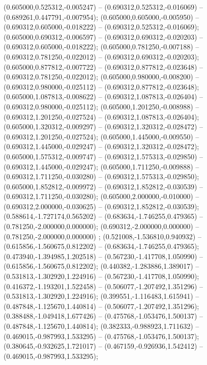  (0.605000,0.525312,-0.005247) -- (0.690312,0.525312,-0.016069) -- (0.689261,0.447791,-0.007954);
 (0.605000,0.605000,-0.005950) -- (0.690312,0.605000,-0.018222) -- (0.690312,0.525312,-0.016069);
 (0.605000,0.690312,-0.006597) -- (0.690312,0.690312,-0.020203) -- (0.690312,0.605000,-0.018222);
 (0.605000,0.781250,-0.007188) -- (0.690312,0.781250,-0.022012) -- (0.690312,0.690312,-0.020203);
 (0.605000,0.877812,-0.007722) -- (0.690312,0.877812,-0.023648) -- (0.690312,0.781250,-0.022012);
 (0.605000,0.980000,-0.008200) -- (0.690312,0.980000,-0.025112) -- (0.690312,0.877812,-0.023648);
 (0.605000,1.087813,-0.008622) -- (0.690312,1.087813,-0.026404) -- (0.690312,0.980000,-0.025112);
 (0.605000,1.201250,-0.008988) -- (0.690312,1.201250,-0.027524) -- (0.690312,1.087813,-0.026404);
 (0.605000,1.320312,-0.009297) -- (0.690312,1.320312,-0.028472) -- (0.690312,1.201250,-0.027524);
 (0.605000,1.445000,-0.009550) -- (0.690312,1.445000,-0.029247) -- (0.690312,1.320312,-0.028472);
 (0.605000,1.575312,-0.009747) -- (0.690312,1.575313,-0.029850) -- (0.690312,1.445000,-0.029247);
 (0.605000,1.711250,-0.009888) -- (0.690312,1.711250,-0.030280) -- (0.690312,1.575313,-0.029850);
 (0.605000,1.852812,-0.009972) -- (0.690312,1.852812,-0.030539) -- (0.690312,1.711250,-0.030280);
 (0.605000,2.000000,-0.010000) -- (0.690312,2.000000,-0.030625) -- (0.690312,1.852812,-0.030539);
 (0.588614,-1.727174,0.565202) -- (0.683634,-1.746255,0.479365) -- (0.781250,-2.000000,0.000000);
 (0.690312,-2.000000,0.000000) -- (0.781250,-2.000000,0.000000) ;
 (0.521008,-1.536810,0.940932) -- (0.615856,-1.560675,0.812202) -- (0.683634,-1.746255,0.479365);
 (0.473940,-1.394985,1.202518) -- (0.567230,-1.417708,1.050990) -- (0.615856,-1.560675,0.812202);
 (0.440382,-1.283886,1.389017) -- (0.531813,-1.302920,1.224916) -- (0.567230,-1.417708,1.050990);
 (0.416372,-1.193201,1.522458) -- (0.506077,-1.207492,1.351296) -- (0.531813,-1.302920,1.224916);
 (0.399551,-1.116483,1.615941) -- (0.487848,-1.125670,1.440814) -- (0.506077,-1.207492,1.351296);
 (0.388488,-1.049418,1.677426) -- (0.475768,-1.053476,1.500137) -- (0.487848,-1.125670,1.440814);
 (0.382333,-0.988923,1.711632) -- (0.469015,-0.987993,1.533295) -- (0.475768,-1.053476,1.500137);
 (0.380645,-0.932625,1.721017) -- (0.467159,-0.926936,1.542412) -- (0.469015,-0.987993,1.533295);
